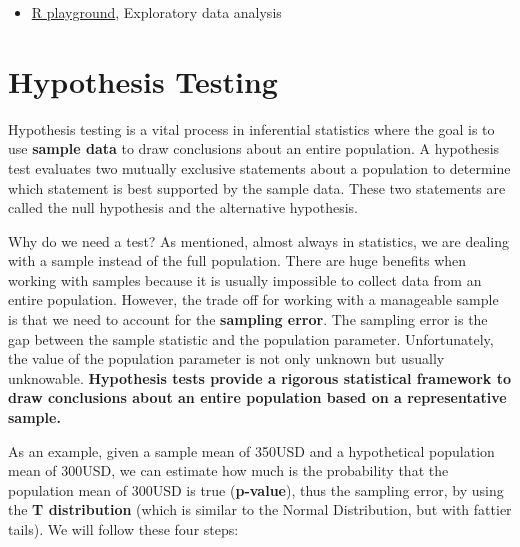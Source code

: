\documentclass[
]{article}
\providecommand{\tightlist}{%
  \setlength{\itemsep}{0pt}\setlength{\parskip}{0pt}}
\begin{document}
\begin{itemize}
\tightlist
\item
  \href{https://federicoroscioli.shinyapps.io/exercises/}{R playground},
  Exploratory data analysis
\end{itemize}

\newpage

\hypertarget{hypothesis-testing}{%
\section{Hypothesis Testing}\label{hypothesis-testing}}

Hypothesis testing is a vital process in inferential statistics where
the goal is to use \textbf{sample data} to draw conclusions about an entire
population. A hypothesis test evaluates two mutually exclusive
statements about a population to determine which statement is best
supported by the sample data. These two statements are called the null
hypothesis and the alternative hypothesis.

Why do we need a test? As mentioned, almost always in statistics, we are
dealing with a sample instead of the full population. There are huge
benefits when working with samples because it is usually impossible to
collect data from an entire population. However, the trade off for
working with a manageable sample is that we need to account for the
\textbf{sampling error}. The sampling error is the gap between the sample
statistic and the population parameter. Unfortunately, the value of the
population parameter is not only unknown but usually unknowable.
\textbf{Hypothesis tests provide a rigorous statistical framework to draw
conclusions about an entire population based on a representative
sample.}

As an example, given a sample mean of 350USD and a hypothetical
population mean of 300USD, we can estimate how much is the probability
that the population mean of 300USD is true (\textbf{p-value}), thus the
sampling error, by using the \textbf{T distribution} (which is similar to the
Normal Distribution, but with fattier tails). We will follow these four
steps:
\end{document}
